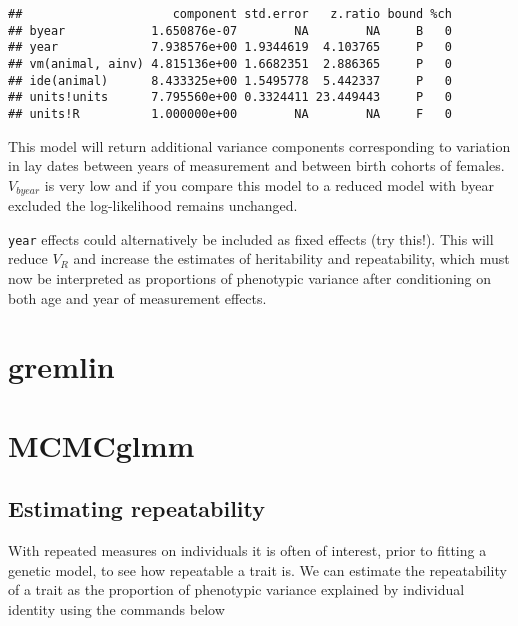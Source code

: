 \documentclass[12pt,]{book}
\newenvironment{Shaded}{\begin{snugshade}}{\end{snugshade}}
\newcommand{\KeywordTok}[1]{\textcolor[rgb]{0.13,0.29,0.53}{\textbf{#1}}}
\newcommand{\NormalTok}[1]{#1}
\newcommand{\OperatorTok}[1]{\textcolor[rgb]{0.81,0.36,0.00}{\textbf{#1}}}
\begin{document}
\begin{Shaded}
\end{Shaded}

\begin{verbatim}
##                     component std.error   z.ratio bound %ch
## byear            1.650876e-07        NA        NA     B   0
## year             7.938576e+00 1.9344619  4.103765     P   0
## vm(animal, ainv) 4.815136e+00 1.6682351  2.886365     P   0
## ide(animal)      8.433325e+00 1.5495778  5.442337     P   0
## units!units      7.795560e+00 0.3324411 23.449443     P   0
## units!R          1.000000e+00        NA        NA     F   0
\end{verbatim}

This model will return additional variance components corresponding to variation in lay dates between years of measurement and between birth cohorts of females. \(V_{byear}\) is very low and if you compare this model to a reduced model with byear excluded the log-likelihood remains unchanged.

\texttt{year} effects could alternatively be included as fixed effects (try this!). This will reduce \(V_R\) and increase the estimates of heritability and repeatability, which must now be interpreted as proportions of phenotypic variance after conditioning on both age and year of measurement effects.

\hypertarget{gremlin-3}{%
\section{gremlin}\label{gremlin-3}}

\hypertarget{mcmcglmm-3}{%
\section{MCMCglmm}\label{mcmcglmm-3}}

\hypertarget{estimating-repeatability-1}{%
\subsection{Estimating repeatability}\label{estimating-repeatability-1}}

With repeated measures on individuals it is often of interest, prior to fitting a genetic model, to see how repeatable a trait is. We can estimate the repeatability of a trait as the proportion of phenotypic variance explained by individual identity using the commands below
\end{document}

